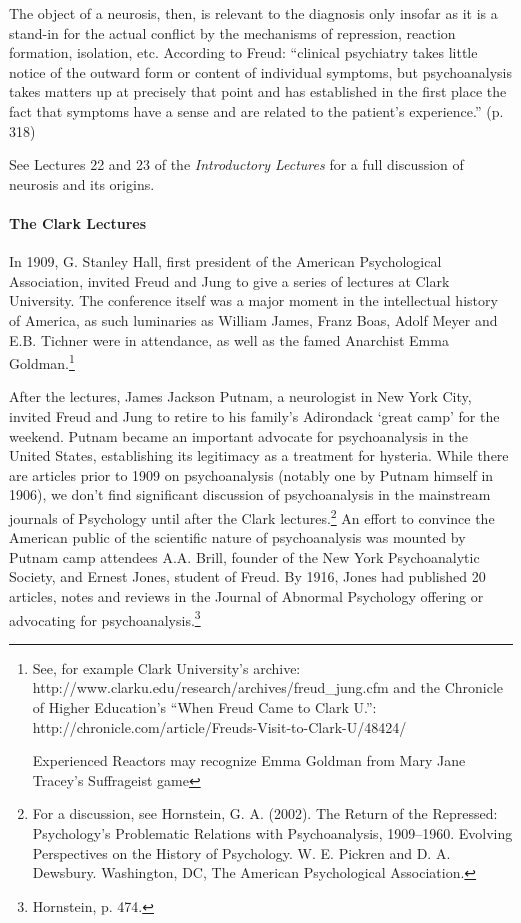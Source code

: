 The object of a neurosis, then, is relevant to the diagnosis only insofar as it is a stand-in for the actual conflict by the mechanisms of repression, reaction formation, isolation, etc. According to Freud: “clinical psychiatry takes little notice of the outward form or content of individual symptoms, but psychoanalysis takes matters up at precisely that point and has established in the first place the fact that symptoms have a sense and are related to the patient's experience.” (p. 318)

See Lectures 22 and 23 of the \emph{Introductory Lectures} for a full discussion of neurosis and its origins.

\paragraph{The Clark Lectures}
\label{theclarklectures}

In 1909, G. Stanley Hall, first president of the American Psychological Association, invited Freud and Jung to give a series of lectures at Clark University. The conference itself was a major moment in the intellectual history of America, as such luminaries as William James, Franz Boas, Adolf Meyer and E.B. Tichner were in attendance, as well as the famed Anarchist Emma Goldman.\footnote{See, for example Clark University's archive: http:\slash \slash www.clarku.edu\slash research\slash archives\slash freud\_jung.cfm and the Chronicle of Higher Education's “When Freud Came to Clark U.”: http:\slash \slash chronicle.com\slash article\slash Freuds-Visit-to-Clark-U\slash 48424\slash 

Experienced Reactors may recognize Emma Goldman from Mary Jane Tracey's Suffrageist game}

After the lectures, James Jackson Putnam, a neurologist in New York City, invited Freud and Jung to retire to his family's Adirondack `great camp' for the weekend. Putnam became an important advocate for psychoanalysis in the United States, establishing its legitimacy as a treatment for hysteria. While there are articles prior to 1909 on psychoanalysis (notably one by Putnam himself in 1906), we don't find significant discussion of psychoanalysis in the mainstream journals of Psychology until after the Clark lectures.\footnote{For a discussion, see Hornstein, G. A. (2002). The Return of the Repressed: Psychology's Problematic Relations with Psychoanalysis, 1909--1960. Evolving Perspectives on the History of Psychology. W. E. Pickren and D. A. Dewsbury. Washington, DC, The American Psychological Association.} An effort to convince the American public of the scientific nature of psychoanalysis was mounted by Putnam camp attendees A.A. Brill, founder of the New York Psychoanalytic Society, and Ernest Jones, student of Freud. By 1916, Jones had published 20 articles, notes and reviews in the Journal of Abnormal Psychology offering or advocating for psychoanalysis.\footnote{Hornstein, p. 474.}

